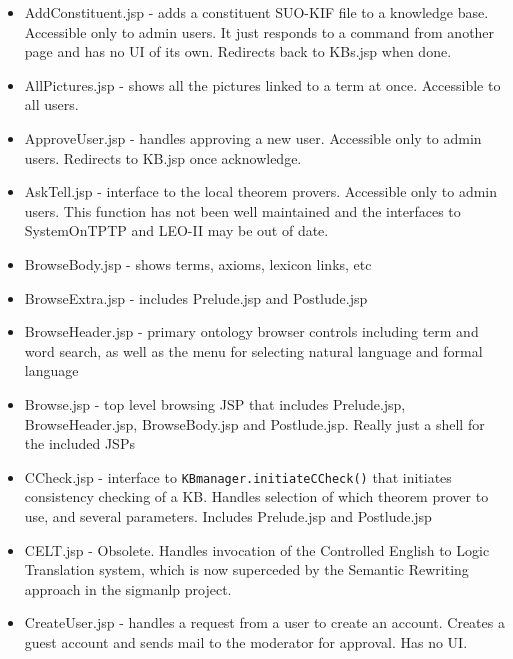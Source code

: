 \documentclass{book}
\begin{document}
\begin{itemize}

\item AddConstituent.jsp - adds a constituent SUO-KIF file to a knowledge base.  Accessible only to
admin users.  It just responds to a command from another page and has no UI of its own.
Redirects back to KBs.jsp when done.

\item AllPictures.jsp - shows all the pictures linked to a term at once.  Accessible to all users.

\item ApproveUser.jsp - handles approving a new user.  Accessible only to admin users. Redirects
to KB.jsp once acknowledge.

\item AskTell.jsp - interface to the local theorem provers. Accessible only to admin users. This function
has not been well maintained and the interfaces to SystemOnTPTP and LEO-II may be out of date.

\item BrowseBody.jsp - shows terms, axioms, lexicon links, etc

\item BrowseExtra.jsp - includes Prelude.jsp and Postlude.jsp

\item BrowseHeader.jsp - primary ontology browser controls including term and word search, as well as
the menu for selecting natural language and formal language

\item Browse.jsp - top level browsing JSP that includes Prelude.jsp, BrowseHeader.jsp, BrowseBody.jsp
and Postlude.jsp.  Really just a shell for the included JSPs

\item CCheck.jsp - interface to \texttt{KBmanager.initiateCCheck()} that initiates consistency checking of a KB.
Handles selection of which theorem prover to use, and several parameters.  Includes Prelude.jsp
and Postlude.jsp

\item CELT.jsp - Obsolete.  Handles invocation of the Controlled English to Logic Translation system,
which is now superceded by the Semantic Rewriting approach in the sigmanlp project.

\item CreateUser.jsp - handles a request from a user to create an account.  Creates a guest account
and sends mail to the moderator for approval.  Has no UI.


\end{itemize}
\end{document}
